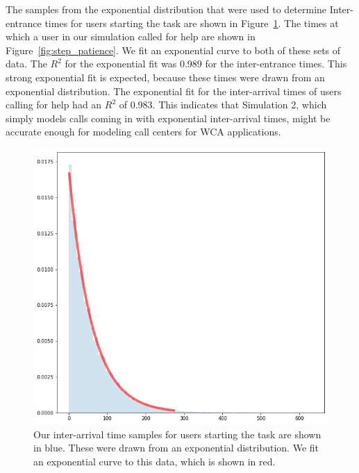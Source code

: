 The samples from the exponential distribution that were used to determine
Inter-entrance times for users starting the task are shown in
Figure~\ref{fig:arrival_times}.
The times at which a user in our simulation called for help are shown in
Figure~\ref{fig:step_patience}.
We fit an exponential curve to both of these sets of data.
The $R^2$ for the exponential fit was 0.989 for the inter-entrance times.
This strong exponential fit is expected, because these times were drawn from an
exponential distribution.
The exponential fit for the inter-arrival times of users calling for help had
an $R^2$ of 0.983.
This indicates that Simulation 2, which simply models calls coming in with
exponential inter-arrival times, might be accurate enough for modeling call
centers for WCA applications.

\begin{figure}[H]
  \includegraphics[width=\textwidth]{figures/montecarlo/arrival_times.png}
  \caption{
    Our inter-arrival time samples for users starting the task are shown in
    blue.
    These were drawn from an exponential distribution.
    We fit an exponential curve to this data, which is shown in red.
  }\label{fig:arrival_times}
\end{figure}

